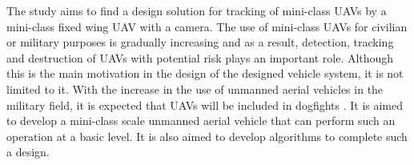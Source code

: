 \documentclass[a0paper,fontscale=0.5]{baposter} %
\begin{document}
\begin{poster}
{        The study aims to find a design solution for tracking of mini-class UAVs by a mini-class fixed wing UAV with a camera. The use of mini-class UAVs for civilian or military purposes is gradually increasing \cite{laytonai} and as a result, detection, tracking and destruction of UAVs with potential risk plays an important role. Although this is the main motivation in the design of the designed vehicle system, it is not limited to it. With the increase in the use of unmanned aerial vehicles in the military field, it is expected that UAVs will be included in dogfights \cite{hassanalian2017classifications}. It is aimed to develop a mini-class scale unmanned aerial vehicle that can perform such an operation at a basic level. It is also aimed to develop algorithms to complete such a design.

    }








\end{poster}
\end{document}
